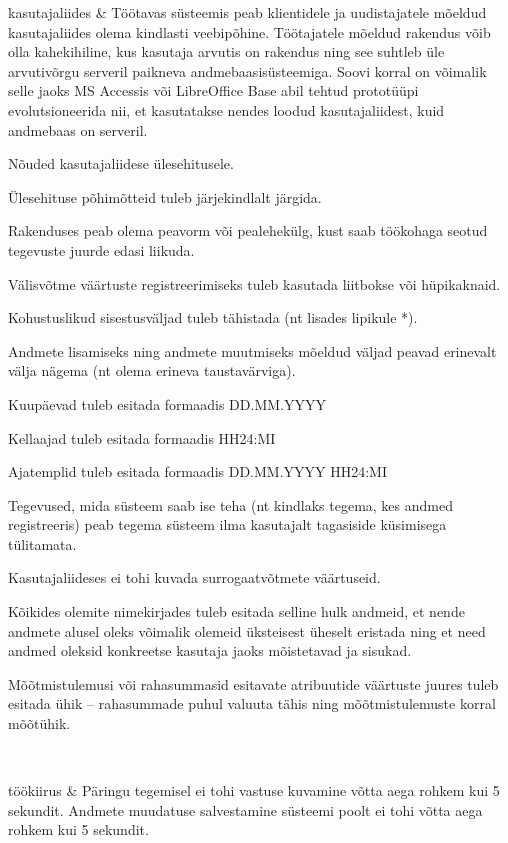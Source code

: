 \begin{longtabu}
	kasutajaliides 
	& Töötavas süsteemis peab klientidele ja uudistajatele mõeldud kasutajaliides olema kindlasti veebipõhine. Töötajatele mõeldud rakendus võib olla kahekihiline, kus kasutaja arvutis on rakendus ning see suhtleb üle arvutivõrgu serveril paikneva andmebaasisüsteemiga. Soovi korral on võimalik selle jaoks MS Accessis või LibreOffice Base abil tehtud prototüüpi evolutsioneerida nii, et kasutatakse nendes loodud kasutajaliidest, kuid andmebaas on serveril.  \linebreak \par
	Nõuded kasutajaliidese ülesehitusele.
	\begin{myitemize}
		\item Ülesehituse põhimõtteid tuleb järjekindlalt järgida.
		\item Rakenduses peab olema peavorm või pealehekülg, kust saab töökohaga seotud tegevuste juurde edasi liikuda.
		\item Välisvõtme väärtuste registreerimiseks tuleb kasutada liitbokse või hüpikaknaid.
		\item Kohustuslikud sisestusväljad tuleb tähistada (nt lisades lipikule *).
		\item Andmete lisamiseks ning andmete muutmiseks mõeldud väljad peavad erinevalt välja nägema (nt olema erineva taustavärviga).
		\item Kuupäevad tuleb esitada formaadis DD.MM.YYYY
		\item Kellaajad tuleb esitada formaadis HH24:MI
		\item Ajatemplid tuleb esitada formaadis DD.MM.YYYY HH24:MI
		\item Tegevused, mida süsteem saab ise teha (nt kindlaks tegema, kes andmed registreeris) peab tegema süsteem ilma kasutajalt tagasiside küsimisega tülitamata.
		\item Kasutajaliideses ei tohi kuvada surrogaatvõtmete väärtuseid.
		\item Kõikides olemite nimekirjades tuleb esitada selline hulk andmeid, et nende andmete alusel oleks võimalik olemeid üksteisest üheselt eristada ning et need andmed oleksid konkreetse kasutaja jaoks mõistetavad ja sisukad.
		\item Mõõtmistulemusi või rahasummasid esitavate atribuutide väärtuste juures tuleb esitada ühik – rahasummade puhul valuuta tähis ning mõõtmistulemuste korral mõõtühik.
	\end{myitemize} \\ \hline
	
	töökiirus 
	& Päringu tegemisel ei tohi vastuse kuvamine võtta aega rohkem kui 5 sekundit. Andmete muudatuse salvestamine süsteemi poolt ei tohi võtta aega rohkem kui 5 sekundit.  \\ \hline
	

\end{longtabu}
